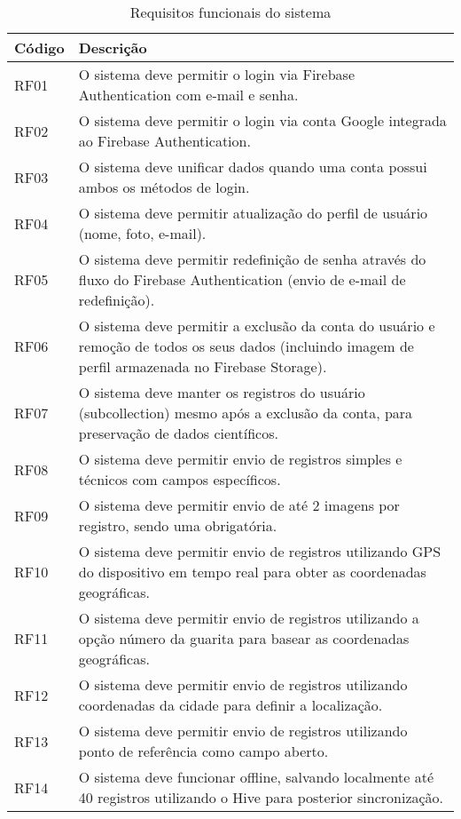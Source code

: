 \begin{table}[H]
    \centering
    \caption{Requisitos funcionais do sistema}
    \label{tab:req-funcionais}
    \begin{tabular}{|p{2cm}|p{11cm}|}
    \hline
    \textbf{Código} & \textbf{Descrição} \\ \hline
    RF01 & O sistema deve permitir o login via Firebase Authentication com e-mail e senha. \\ \hline
    RF02 & O sistema deve permitir o login via conta Google integrada ao Firebase Authentication. \\ \hline
    RF03 & O sistema deve unificar dados quando uma conta possui ambos os métodos de login. \\ \hline
    RF04 & O sistema deve permitir atualização do perfil de usuário (nome, foto, e-mail). \\ \hline
    RF05 & O sistema deve permitir redefinição de senha através do fluxo do Firebase Authentication (envio de e-mail de redefinição). \\ \hline
    RF06 & O sistema deve permitir a exclusão da conta do usuário e remoção de todos os seus dados (incluindo imagem de perfil armazenada no Firebase Storage). \\ \hline
    RF07 & O sistema deve manter os registros do usuário (subcollection) mesmo após a exclusão da conta, para preservação de dados científicos. \\ \hline
    RF08 & O sistema deve permitir envio de registros simples e técnicos com campos específicos. \\ \hline
    RF09 & O sistema deve permitir envio de até 2 imagens por registro, sendo uma obrigatória. \\ \hline
    RF10 & O sistema deve permitir envio de registros utilizando GPS do dispositivo em tempo real para obter as coordenadas geográficas. \\ \hline
    RF11 & O sistema deve permitir envio de registros utilizando a opção número da guarita para basear as coordenadas geográficas. \\ \hline
    RF12 & O sistema deve permitir envio de registros utilizando coordenadas da cidade para definir a localização. \\ \hline
    RF13 & O sistema deve permitir envio de registros utilizando ponto de referência como campo aberto. \\ \hline
    RF14 & O sistema deve funcionar offline, salvando localmente até 40 registros utilizando o Hive para posterior sincronização. \\ \hline

\end{tabular}
\end{table}
